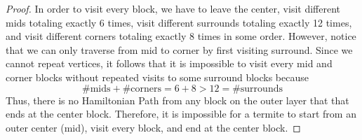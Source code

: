 \documentclass{article}
\begin{document}
\begin{proof}
  In order to visit every block, we have to leave the center, visit different 
  mids totaling exactly 6 times, visit different surrounds totaling exactly 
  12 times, and visit different corners totaling exactly 8 times in some
  order. However, notice that we can only traverse from mid to corner by first
  visiting surround. Since we cannot repeat vertices, it follows that it is
  impossible to visit every mid and corner blocks without repeated visits to some
  surround blocks because
  \[ \text{\# mids} + \text{\# corners} = 6 + 8 > 12 = \text{\# surrounds} \]
  Thus, there is no Hamiltonian Path from any block on the outer layer that that
  ends at the center block. Therefore, it is impossible for a termite to start
  from an outer center (mid), visit every block, and end at the center block. 
\end{proof}


% 
% 
\end{document}
